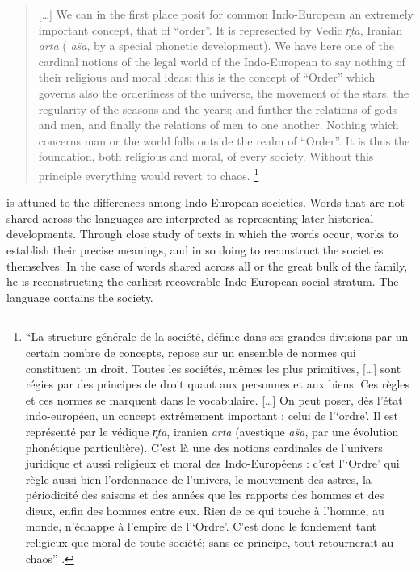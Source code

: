 \documentclass[output=paper]{langscibook}
\begin{document}
\begin{quotation}
[…] We can in the first place posit for common Indo-European an extremely important concept, that of ``order''. It is represented by Vedic \emph{r̥ta}, Iranian \emph{arta} ({\Armenian} \emph{aša}, by a special phonetic development). We have here one of the cardinal notions of the legal world of the Indo-European to say nothing of their religious and moral ideas: this is the concept of ``Order'' which governs also the orderliness of the universe, the movement of the stars, the regularity of the seasons and the years; and further the relations of gods and men, and finally the relations of men to one another. Nothing which concerns man or the world falls outside the realm of ``Order''. It is thus the foundation, both religious and moral, of every society. Without this principle everything would revert to chaos. \citep[379--380]{Benveniste20161973}\footnote{``La structure générale de la société, définie dans ses grandes divisions par un certain nombre de concepts, repose sur un ensemble de normes qui constituent un droit. Toutes les sociétés, mêmes les plus primitives, […] sont régies par des principes de droit quant aux personnes et aux biens. Ces règles et ces normes se marquent dans le vocabulaire. […] On peut poser, dès l'état indo-européen, un concept extrêmement important : celui de l'`ordre'. Il est représenté par le védique \emph{r̥ta}, iranien \emph{arta} (avestique \emph{aša}, par une évolution phonétique particulière). C'est là une des notions cardinales de l'univers juridique et aussi religieux et moral des Indo-Européens : c'est l'`Ordre' qui règle aussi bien l'ordonnance de l'univers, le mouvement des astres, la périodicité des saisons et des années que les rapports des hommes et des dieux, enfin des hommes entre eux. Rien de ce qui touche à l'homme, au monde, n'échappe à l'empire de l'`Ordre'. C'est donc le fondement tant religieux que moral de toute société; sans ce principe, tout retournerait au chaos'' \citep[vol. 2, 99--100]{Benveniste1969vocabulaire}.}
\end{quotation}

{\Benveniste} is attuned to the differences among Indo-European societies. Words that are not shared across the languages are interpreted as representing later historical developments. Through close study of texts in which the words occur, {\Benveniste} works to establish their precise meanings, and in so doing to reconstruct the societies themselves. In the case of words shared across all or the great bulk of the family, he is reconstructing the earliest recoverable Indo-European social stratum. The language contains the society.
\end{document}
